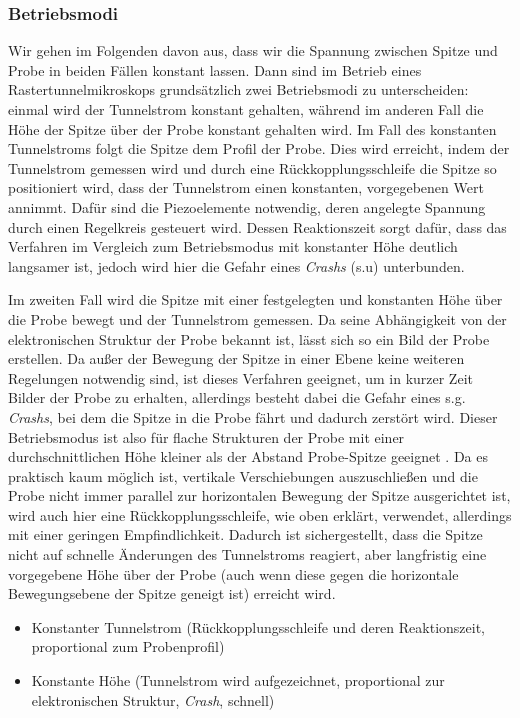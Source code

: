 \documentclass[10pt, a4paper]{article}
\begin{document}
\subsubsection{Betriebsmodi}
\label{sec:betriebsmodi}
Wir gehen im Folgenden davon aus, dass wir die Spannung zwischen Spitze und Probe in beiden Fällen konstant lassen.
Dann sind im Betrieb eines Rastertunnelmikroskops grundsätzlich zwei Betriebsmodi zu unterscheiden:
einmal wird der Tunnelstrom konstant gehalten, während im anderen Fall die Höhe der Spitze über der Probe konstant gehalten wird.
Im Fall des konstanten Tunnelstroms folgt die Spitze dem Profil der Probe.
Dies wird erreicht, indem der Tunnelstrom gemessen wird und durch eine Rückkopplungsschleife die Spitze so positioniert wird, dass der Tunnelstrom einen konstanten, vorgegebenen Wert annimmt.
Dafür sind die Piezoelemente notwendig, deren angelegte Spannung durch einen Regelkreis gesteuert wird.
Dessen Reaktionszeit sorgt dafür, dass das Verfahren im Vergleich zum Betriebsmodus mit konstanter Höhe deutlich langsamer ist, jedoch wird hier die Gefahr eines \textit{Crashs} (s.u) unterbunden.

Im zweiten Fall wird die Spitze mit einer festgelegten und konstanten Höhe über die Probe bewegt und der Tunnelstrom gemessen.
Da seine Abhängigkeit von der elektronischen Struktur der Probe bekannt ist, lässt sich so ein Bild der Probe erstellen.
Da außer der Bewegung der Spitze in einer Ebene keine weiteren Regelungen notwendig sind, ist dieses Verfahren geeignet, um in kurzer Zeit Bilder der Probe zu erhalten, allerdings besteht dabei die Gefahr eines s.g. \textit{Crashs}, bei dem die Spitze in die Probe fährt und dadurch zerstört wird.
Dieser Betriebsmodus ist also für flache Strukturen der Probe mit einer durchschnittlichen Höhe kleiner als der Abstand Probe-Spitze geeignet \cite{colton}.
Da es praktisch kaum möglich ist, vertikale Verschiebungen auszuschließen und die Probe nicht immer parallel zur horizontalen Bewegung der Spitze ausgerichtet ist, wird auch hier eine Rückkopplungsschleife, wie oben erklärt, verwendet, allerdings mit einer geringen Empfindlichkeit. Dadurch ist sichergestellt, dass die Spitze nicht auf schnelle Änderungen des Tunnelstroms reagiert, aber langfristig eine vorgegebene Höhe über der Probe (auch wenn diese gegen die horizontale Bewegungsebene der Spitze geneigt ist) erreicht wird.
 
\begin{itemize}
  \item Konstanter Tunnelstrom (Rückkopplungsschleife und deren Reaktionszeit, proportional zum Probenprofil)
  \item Konstante Höhe (Tunnelstrom wird aufgezeichnet, proportional zur elektronischen Struktur, \emph{Crash}, schnell)
\end{itemize}
\end{document}

